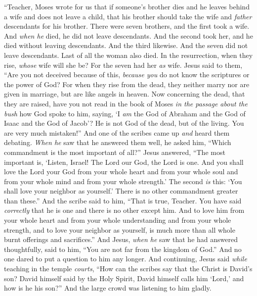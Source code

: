\begin{biblechapter}
\verse “Teacher, Moses wrote for us that if someone’s brother dies and he leaves behind a wife and does not leave a child, that his brother should take the wife and \textit{father} descendants for his brother.
\verse There were seven brothers, and the first took a wife. And \textit{when he} died, he did not leave descendants.
\verse And the second took her, and he died without leaving descendants. And the third likewise.
\verse And the seven did not leave descendants. Last of all the woman also died.
\verse In the resurrection, when they rise, \textit{whose} wife will she be? For the seven had her \textit{as} wife.
\verse Jesus said to them, “Are you not deceived because of this, \textit{because you} do not know the scriptures or the power of God?
\verse For when they rise from the dead, they neither marry nor are given in marriage, but are like angels in heaven.
\verse Now concerning the dead, that they are raised, have you not read in the book of Moses \textit{in the passage about the bush} how God spoke to him, saying, ‘I \textit{am} the God of Abraham and the God of Isaac and the God of Jacob’?
\verse He is not God of the dead, but of the living. You are very much mistaken!”
 And one of the scribes came up \textit{and} heard them debating. \textit{When he} saw that he answered them well, he asked him, “Which commandment is the most important of all?”
\verse Jesus answered, “The most important is, ‘Listen, Israel! The Lord our God, the Lord is one.
\verse And you shall love the Lord your God from your whole heart and from your whole soul and from your whole mind and from your whole strength.’
\verse The second \textit{is} this: ‘You shall love your neighbor as yourself.’ There is no other commandment greater than these.”
\verse And the scribe said to him, “That is true, Teacher. You have said \textit{correctly} that he is one and there is no other except him.
\verse And to love him from your whole heart and from your whole understanding and from your whole strength, and to love your neighbor as yourself, is much more than all whole burnt offerings and sacrifices.”
\verse And Jesus, \textit{when he} saw that he had answered thoughtfully, said to him, “You are not far from the kingdom of God.” And no one dared to put a question to him any longer.
 And continuing, Jesus said \textit{while} teaching in the temple \textit{courts}, “How can the scribes say that the Christ is David’s son?
\verse David himself said by the Holy Spirit,
\verse David himself calls him ‘Lord,’ and how is he his son?” And the large crowd was listening to him gladly.

\end{biblechapter}
